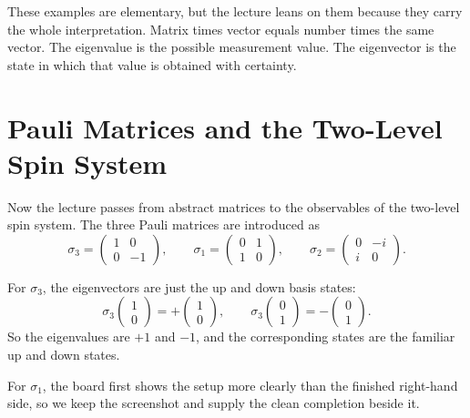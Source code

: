 These examples are elementary, but the lecture leans on them because they carry the whole interpretation. Matrix times vector equals number times the same vector. The eigenvalue is the possible measurement value. The eigenvector is the state in which that value is obtained with certainty.

\section{Pauli Matrices and the Two-Level Spin System}

Now the lecture passes from abstract matrices to the observables of the two-level spin system. The three Pauli matrices are introduced as
\begin{equation}
\sigma_3=
\begin{pmatrix}
1&0\\
0&-1
\end{pmatrix},
\qquad
\sigma_1=
\begin{pmatrix}
0&1\\
1&0
\end{pmatrix},
\qquad
\sigma_2=
\begin{pmatrix}
0&-i\\
i&0
\end{pmatrix}.
\end{equation}

For \(\sigma_3\), the eigenvectors are just the up and down basis states:
\begin{equation}
\sigma_3
\begin{pmatrix}
1\\
0
\end{pmatrix}
=
+
\begin{pmatrix}
1\\
0
\end{pmatrix},
\qquad
\sigma_3
\begin{pmatrix}
0\\
1
\end{pmatrix}
=
-
\begin{pmatrix}
0\\
1
\end{pmatrix}.
\end{equation}
So the eigenvalues are \(+1\) and \(-1\), and the corresponding states are the familiar up and down states.

For \(\sigma_1\), the board first shows the setup more clearly than the finished right-hand side, so we keep the screenshot and supply the clean completion beside it.

